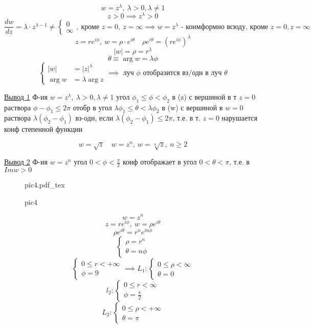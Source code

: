 \documentclass[a4paper]{article}
\newcommand{\incfig}[1]{%
\def\svgwidth{\columnwidth}
{#1.pdf_tex}
}
\begin{document}
\[
    w = z^{\lambda}, \ \lambda > 0, \lambda \neq 1
\]
\[
    z > 0 \implies z^{\lambda} > 0
\]
\[
    \frac{dw}{dz} = \lambda \cdot z^{\lambda - 1} \neq 
    \begin{cases}
       0 \\
       \infty
    \end{cases}, \ \text{кроме } z =0,
    \ z = \infty
    \implies w = z^{\lambda} \text{ - конмформно всюду, кроме } z = 0, z = \infty
\]
\[
    z = r e^{i \phi}, \ w = \rho \cdot e^{i\theta} \quad \rho e^{i\theta} = 
    (r e^{i \phi})^{\lambda}
\]
\[
    |w| = \rho = r^{\lambda}
\]
\[
    \theta \equiv \arg w = \lambda \phi 
\]
\[
    \begin{cases}
        |w| &= |z|^{\lambda} \\
        \arg w &= \lambda \arg z
    \end{cases}
    \implies \text{ луч }\phi \text{ отобразится вз/одн в луч } \theta
\]

\underline{Вывод 1} Ф-ия $ w = z^{\lambda}, \ \lambda > 0, \lambda \neq 1 $ угол
$ \phi_1 \leq \phi < \phi_2 $ в (z) с вершиной в т $ z = 0 $ раствора $ \phi -
\phi_1 \leq 2 \pi $ отобр в угол $ \lambda \phi_1 \leq \theta < \lambda \phi_2 $ 
в (w) с вершиной в $ w = 0 $ раствора $ \lambda (\phi_2 - \phi_1) $ вз-одн, если
$ \lambda(\phi_2 - \phi_1) \leq 2 \pi $, т.е. в т. $ z = 0 $ нарушается конф 
степенной функции

\[
    w = \sqrt{z} \quad w = z^{n}, \ w = \sqrt[n]{z}, \ n \geq 2  
\]

\underline{Вывод 2} Ф-ия $ w = z^{n} $ угол $ 0 < \phi < \frac{\pi}{2} $ 
конф отображает в угол $ 0 < \theta < \pi $, т.е. в $ Im w > 0 $ 

\begin{figure}[!ht]
    \centering
    \incfig{pic4}
    \caption{pic4}
    \label{fig:pic4}
\end{figure}

\[
    w = z^{n}
\]
\[
    z = r e^{i\phi}, \ w = \rho e^{i\theta}
\]
\[
    \rho e^{i\theta}= r^{n} e^{i n \phi}
\]
\[
    \begin{cases}
        \rho = r^{n}\\
        \theta = n\phi
    \end{cases}
\]
\[
    \begin{cases}
        0 \leq r < + \infty\\
        \phi = 9
    \end{cases}
    \implies L_1 : 
    \begin{cases}
        0 \leq \rho < \infty\\
        \theta = 0
    \end{cases}
\]
\[
    l_2: \begin{cases}
        0 \leq r < \infty\\
        \phi = \frac{\pi}{2} 
    \end{cases}
\]
\[
    L_2: \begin{cases}
        0 \leq \rho < +\infty\\
        \theta = \pi
    \end{cases}
\]
\end{document}
